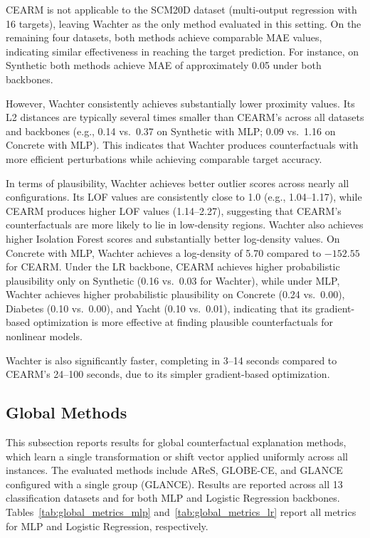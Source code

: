 \documentclass[runningheads]{llncs}
\begin{document}
CEARM is not applicable to the SCM20D dataset (multi-output regression with 16 targets), leaving Wachter as the only method evaluated in this setting. On the remaining four datasets, both methods achieve comparable MAE values, indicating similar effectiveness in reaching the target prediction. For instance, on Synthetic both methods achieve MAE of approximately 0.05 under both backbones.

However, Wachter consistently achieves substantially lower proximity values. Its L2 distances are typically several times smaller than CEARM's across all datasets and backbones (e.g., 0.14 vs.\ 0.37 on Synthetic with MLP; 0.09 vs.\ 1.16 on Concrete with MLP). This indicates that Wachter produces counterfactuals with more efficient perturbations while achieving comparable target accuracy.

In terms of plausibility, Wachter achieves better outlier scores across nearly all configurations. Its LOF values are consistently close to 1.0 (e.g., 1.04--1.17), while CEARM produces higher LOF values (1.14--2.27), suggesting that CEARM's counterfactuals are more likely to lie in low-density regions. Wachter also achieves higher Isolation Forest scores and substantially better log-density values. On Concrete with MLP, Wachter achieves a log-density of 5.70 compared to $-152.55$ for CEARM. Under the LR backbone, CEARM achieves higher probabilistic plausibility only on Synthetic (0.16 vs.\ 0.03 for Wachter), while under MLP, Wachter achieves higher probabilistic plausibility on Concrete (0.24 vs.\ 0.00), Diabetes (0.10 vs.\ 0.00), and Yacht (0.10 vs.\ 0.01), indicating that its gradient-based optimization is more effective at finding plausible counterfactuals for nonlinear models.

Wachter is also significantly faster, completing in 3--14 seconds compared to CEARM's 24--100 seconds, due to its simpler gradient-based optimization.



\subsection{Global Methods}

This subsection reports results for global counterfactual explanation methods, which learn a single transformation or shift vector applied uniformly across all instances. The evaluated methods include AReS, GLOBE-CE, and GLANCE configured with a single group (GLANCE). Results are reported across all 13 classification datasets and for both MLP and Logistic Regression backbones. Tables~\ref{tab:global_metrics_mlp} and~\ref{tab:global_metrics_lr} report all metrics for MLP and Logistic Regression, respectively.
\end{document}
